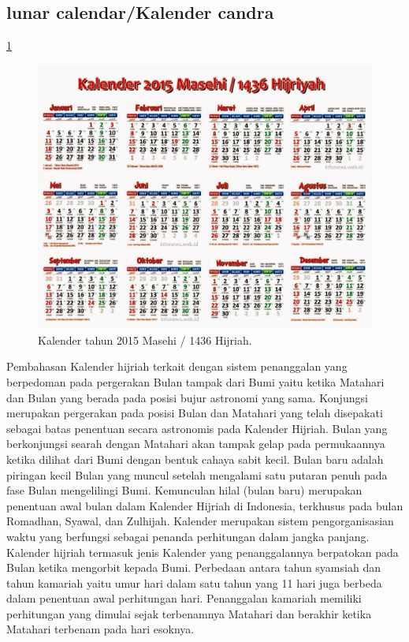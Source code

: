   \subsection{lunar calendar/Kalender candra}
    \ref{Kalender_2015}
    \begin{figure}[ht]
    \centerline{\includegraphics[width=1\textwidth]{figures/Kalender_2015.JPG}}
    \caption{Kalender tahun 2015 Masehi / 1436 Hijriah.}
    \label{Kalender_2015}
    \end{figure}
    Pembahasan Kalender hijriah terkait dengan sistem penanggalan yang berpedoman pada pergerakan Bulan tampak dari Bumi yaitu ketika Matahari dan Bulan yang berada pada posisi bujur astronomi yang sama. Konjungsi merupakan pergerakan pada posisi Bulan dan Matahari yang telah disepakati sebagai batas penentuan secara astronomis pada Kalender Hijriah.
  Bulan yang berkonjungsi searah dengan Matahari akan tampak gelap pada permukaannya ketika dilihat dari Bumi dengan bentuk cahaya sabit kecil. Bulan baru adalah piringan kecil Bulan yang muncul setelah mengalami satu putaran penuh pada fase Bulan mengelilingi Bumi.
  Kemunculan hilal (bulan baru) merupakan penentuan awal bulan dalam Kalender Hijriah di Indonesia, terkhusus pada bulan Romadhan, Syawal, dan Zulhijah. Kalender merupakan sistem pengorganisasian waktu yang berfungsi sebagai penanda perhitungan dalam jangka panjang. Kalender hijriah termasuk jenis Kalender yang penanggalannya berpatokan pada Bulan ketika mengorbit kepada Bumi.
  Perbedaan antara tahun syamsiah dan tahun kamariah yaitu umur hari dalam satu tahun yang 11 hari juga berbeda dalam penentuan awal perhitungan hari. Penanggalan kamariah memiliki perhitungan yang dimulai sejak terbenamnya Matahari dan berakhir ketika Matahari terbenam pada hari esoknya.

